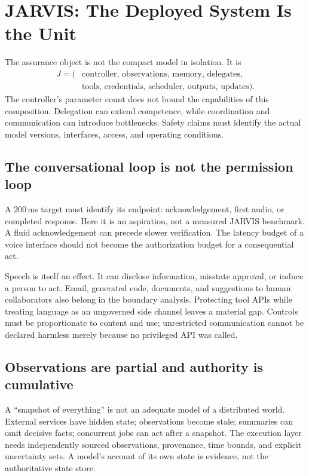\documentclass[10pt,twocolumn,letterpaper]{article}
\begin{document}
\section{JARVIS: The Deployed System Is the Unit}
\label{sec:jarvis}
The assurance object is not the compact model in isolation. It is
\begin{equation}
\begin{split}
J=(&\text{controller, observations, memory, delegates,}\\
&\text{tools, credentials, scheduler, outputs, updates}).
\end{split}
\end{equation}
The controller's parameter count does not bound the capabilities of this composition. Delegation can extend competence, while coordination and communication can introduce bottlenecks. Safety claims must identify the actual model versions, interfaces, access, and operating conditions.

\subsection{The conversational loop is not the permission loop}
A 200\,ms target must identify its endpoint: acknowledgement, first audio, or completed response. Here it is an aspiration, not a measured JARVIS benchmark. A fluid acknowledgement can precede slower verification. The latency budget of a voice interface should not become the authorization budget for a consequential act.

Speech is itself an effect. It can disclose information, misstate approval, or induce a person to act. Email, generated code, documents, and suggestions to human collaborators also belong in the boundary analysis. Protecting tool APIs while treating language as an ungoverned side channel leaves a material gap. Controls must be proportionate to content and use; unrestricted communication cannot be declared harmless merely because no privileged API was called.

\subsection{Observations are partial and authority is cumulative}
A ``snapshot of everything'' is not an adequate model of a distributed world. External services have hidden state; observations become stale; summaries can omit decisive facts; concurrent jobs can act after a snapshot. The execution layer needs independently sourced observations, provenance, time bounds, and explicit uncertainty sets. A model's account of its own state is evidence, not the authoritative state store.
\end{document}
